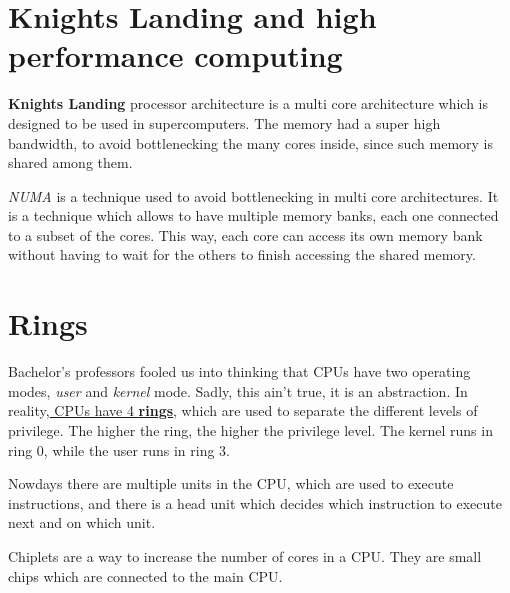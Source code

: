 
\section{Knights Landing and high performance computing}
\textbf{Knights Landing} processor architecture is a multi core architecture which is designed to be used in supercomputers. The memory had a super high bandwidth, to avoid bottlenecking the many cores inside, since such memory is shared among them.

\textit{NUMA} is a technique used to avoid bottlenecking in multi core architectures. It is a technique which allows to have multiple memory banks, each one connected to a subset of the cores. This way, each core can access its own memory bank without having to wait for the others to finish accessing the shared memory.

\section{Rings}
Bachelor's professors fooled us into thinking that CPUs have two operating modes, \textit{user} and \textit{kernel} mode. Sadly, this ain't true, it is an abstraction. In reality,\ul{ CPUs have 4 \textbf{rings}}, which are used to separate the different levels of privilege. The higher the ring, the higher the privilege level.
The kernel runs in ring 0, while the user runs in ring 3.

Nowdays there are multiple units in the CPU, which are used to execute instructions, and there is a head unit which decides which instruction to execute next and on which unit.

Chiplets are a way to increase the number of cores in a CPU. They are small chips which are connected to the main CPU.
